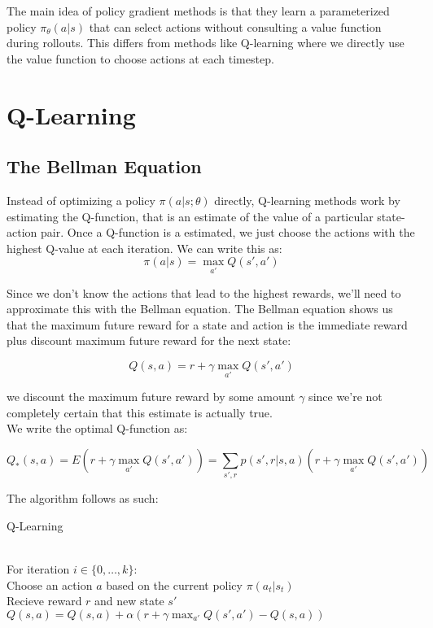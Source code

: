 \documentclass[11pt]{article}
\theoremstyle{plain}
\theoremstyle{definition}
\begin{document}
The main idea of policy gradient methods is that they learn a parameterized policy $\pi_\theta(a|s)$ that can select actions without consulting a value function during rollouts. This differs from methods like Q-learning where we directly use the value function to choose actions at each timestep.

\section{Q-Learning}

\subsection{The Bellman Equation}

Instead of optimizing a policy $\pi(a|s;\theta)$ directly, Q-learning methods work by estimating the Q-function, that is an estimate of the value of a particular state-action pair. Once a Q-function is a estimated, we just choose the actions with the highest Q-value at each iteration. We can write this as:
\begin{equation}
  \pi(a|s) = \max_{a'}Q(s',a')
\end{equation}

Since we don't know the actions that lead to the highest rewards, we'll need to approximate this with the Bellman equation. The Bellman equation shows us that the maximum future reward for a state and action is the immediate reward plus discount maximum future reward for the next state:

\begin{equation}
  Q(s,a) = r + \gamma \max_{a'}Q(s',a')
\end{equation}

we discount the maximum future reward by some amount $\gamma$ since we're not completely certain that this estimate is actually true.
\\

We write the optimal Q-function as:

\begin{equation}
  Q_*(s,a) = E(r + \gamma \max_{a'}Q(s',a'))
  = \sum_{s',r}p(s',r|s,a)(r + \gamma \max_{a'}Q(s',a'))
\end{equation}

The algorithm follows as such:

\begin{algorithm}
\caption{Q-Learning}
\begin{algorithmic}
\\For iteration $i \in \{0,\ldots,k\}$:
\\ \hspace*{4} Choose an action $a$ based on the current policy $\pi(a_t|s_t)$
\\ \hspace*{4} Recieve reward $r$ and new state $s'$
\\ \hspace*{4} $Q(s,a) = Q(s,a) + \alpha(r + \gamma \max_{a'}Q(s',a') - Q(s,a))$
\end{algorithmic}
\end{algorithm}
\end{document}
